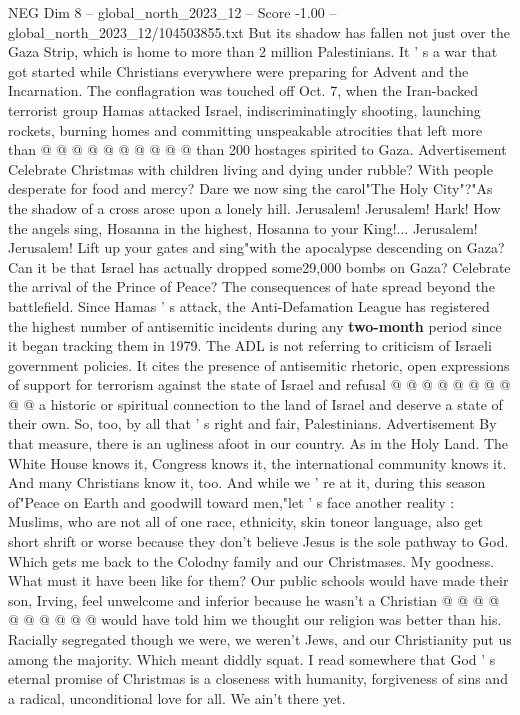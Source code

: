 \begin{textsample}{NEG Dim 8 – global\_north\_2023\_12 – Score -1.00 – global\_north\_2023\_12/104503855.txt}
But its shadow has fallen not just over the Gaza Strip, which is home to more than 2 million Palestinians.
It ' s a war that got started while Christians everywhere were preparing for Advent and the Incarnation.
The conflagration was touched off Oct. 7, when the Iran-backed terrorist group Hamas attacked Israel, indiscriminatingly shooting, launching rockets, burning homes and committing unspeakable atrocities that left more than @ @ @ @ @ @ @ @ @ @ than 200 hostages spirited to Gaza.
Advertisement Celebrate Christmas with children living and dying under rubble?
With people desperate for food and mercy?
Dare we now sing the carol"The Holy City"?"As the shadow of a cross arose upon a lonely hill.
Jerusalem!
Jerusalem!
Hark!
How the angels sing, Hosanna in the highest, Hosanna to your King!...
Jerusalem!
Jerusalem!
Lift up your gates and sing"with the apocalypse descending on Gaza?
Can it be that Israel has actually dropped some29,000 bombs on Gaza?
Celebrate the arrival of the Prince of Peace?
The consequences of hate spread beyond the battlefield.
Since Hamas ' s attack, the Anti-Defamation League has registered the highest number of antisemitic incidents during any \textbf{two-month} period since it began tracking them in 1979.
The ADL is not referring to criticism of Israeli government policies.
It cites the presence of antisemitic rhetoric, open expressions of support for terrorism against the state of Israel and refusal @ @ @ @ @ @ @ @ @ @ a historic or spiritual connection to the land of Israel and deserve a state of their own.
So, too, by all that ' s right and fair, Palestinians.
Advertisement By that measure, there is an ugliness afoot in our country.
As in the Holy Land.
The White House knows it, Congress knows it, the international community knows it.
And many Christians know it, too.
And while we ' re at it, during this season of"Peace on Earth and goodwill toward men,"let ' s face another reality : Muslims, who are not all of one race, ethnicity, skin toneor language, also get short shrift or worse because they don't believe Jesus is the sole pathway to God.
Which gets me back to the Colodny family and our Christmases.
My goodness.
What must it have been like for them?
Our public schools would have made their son, Irving, feel unwelcome and inferior because he wasn't a Christian @ @ @ @ @ @ @ @ @ @ would have told him we thought our religion was better than his.
Racially segregated though we were, we weren't Jews, and our Christianity put us among the majority.
Which meant diddly squat.
I read somewhere that God ' s eternal promise of Christmas is a closeness with humanity, forgiveness of sins and a radical, unconditional love for all.
We ain't there yet.

\end{textsample}
